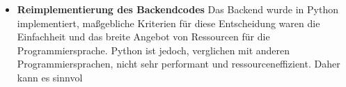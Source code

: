 \documentclass[../main.tex]{subfiles}
\begin{document}
\begin{itemize}
    \item \textbf{Reimplementierung des Backendcodes}
        Das Backend wurde in Python implementiert, maßgebliche Kriterien für diese Entscheidung waren die Einfachheit und das breite Angebot von Ressourcen für die Programmiersprache.
        Python ist jedoch, verglichen mit anderen Programmiersprachen, nicht sehr performant und ressourceneffizient. Daher kann es sinnvol

\end{itemize}
\end{document}
